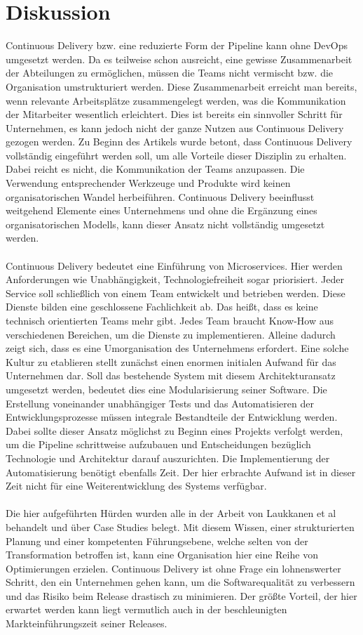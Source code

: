 \section{Diskussion}
Continuous Delivery bzw. eine reduzierte Form der Pipeline kann ohne DevOps umgesetzt werden. Da es teilweise schon ausreicht, eine gewisse Zusammenarbeit der Abteilungen zu ermöglichen, müssen die Teams nicht vermischt bzw. die Organisation umstrukturiert werden. Diese Zusammenarbeit erreicht man bereits, wenn relevante Arbeitsplätze zusammengelegt werden, was die Kommunikation der Mitarbeiter wesentlich erleichtert. Dies ist bereits ein sinnvoller Schritt für Unternehmen, es kann jedoch nicht der ganze Nutzen aus Continuous Delivery gezogen werden. Zu Beginn des Artikels wurde betont, dass Continuous Delivery vollständig eingeführt werden soll, um alle Vorteile dieser Disziplin zu erhalten. Dabei reicht es nicht, die Kommunikation der Teams anzupassen. Die Verwendung entsprechender Werkzeuge und Produkte wird keinen organisatorischen Wandel herbeiführen. Continuous Delivery beeinflusst weitgehend Elemente eines Unternehmens und ohne die Ergänzung eines organisatorischen Modells, kann dieser Ansatz nicht vollständig umgesetzt werden.\\ \\
Continuous Delivery bedeutet eine Einführung von Microservices. Hier werden Anforderungen wie Unabhängigkeit, Technologiefreiheit sogar priorisiert. Jeder Service soll schließlich von einem Team entwickelt und betrieben werden. Diese Dienste bilden eine geschlossene Fachlichkeit ab. Das heißt, dass es keine technisch orientierten Teams mehr gibt. Jedes Team braucht Know-How aus verschiedenen Bereichen, um die Dienste zu implementieren. Alleine dadurch zeigt sich, dass es eine Umorganisation des Unternehmens erfordert. Eine solche Kultur zu etablieren stellt zunächst einen enormen initialen Aufwand für das Unternehmen dar. Soll das bestehende System mit diesem Architekturansatz umgesetzt werden, bedeutet dies eine Modularisierung seiner Software. Die Erstellung voneinander unabhängiger Tests und das Automatisieren der Entwicklungsprozesse müssen integrale Bestandteile der Entwicklung werden. Dabei sollte dieser Ansatz möglichst zu Beginn eines Projekts verfolgt werden, um die Pipeline schrittweise aufzubauen und Entscheidungen bezüglich Technologie und Architektur darauf auszurichten. Die Implementierung der Automatisierung benötigt ebenfalls Zeit. Der hier erbrachte Aufwand ist in dieser Zeit nicht für eine Weiterentwicklung des Systems verfügbar. \\ \\
Die hier aufgeführten Hürden wurden alle in der Arbeit von Laukkanen et al behandelt und über Case Studies belegt. Mit diesem Wissen, einer strukturierten Planung und einer kompetenten Führungsebene, welche selten von der Transformation betroffen ist, kann eine Organisation hier eine Reihe von Optimierungen erzielen. Continuous Delivery ist ohne Frage ein lohnenswerter Schritt, den ein Unternehmen gehen kann, um die Softwarequalität zu verbessern und das Risiko beim Release drastisch zu minimieren. Der größte Vorteil, der hier erwartet werden kann liegt vermutlich auch in der beschleunigten Markteinführungszeit seiner Releases. 

